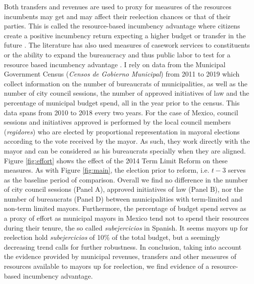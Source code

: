 \documentclass[12pt]{amsart}
\numberwithin{equation}{section}
\theoremstyle{definition}
\theoremstyle{definition}
\theoremstyle{definition}
\begin{document}
Both transfers and revenues are used to proxy for measures of the resources incumbents may get and may affect their reelection chances or that of their parties. This is called the resource-based incumbency advantage where citizens create a positive incumbency return expecting a higher budget or transfer in the future \citep{cox_morgensten_1993}. The literature has also used measures of casework services to constituents or the ability to expand the bureaucracy and thus public labor to test for a resource based incumbency advantage \citep{cox_katz_1996}. I rely on data from the Municipal Government Census (\emph{Censos de Gobierno Municipal}) from 2011 to 2019 which collect information on the number of bureaucrats of municipalities, as well as the number of city council sessions, the number of approved initiatives of law and the percentage of municipal budget spend, all in the year prior to the census. This data spans from 2010 to 2018 every two years. For the case of Mexico, council sessions and initiatives approved is performed by the local council members (\emph{regidores}) who are elected by proportional representation in mayoral elections according to the vote received by the mayor. As such, they work directly with the mayor and can be considered as his bureaucrats specially when they are aligned. Figure \ref{fig:effort} shows the effect of the 2014 Term Limit Reform on these measures. As with Figure \ref{fig:main}, the election prior to reform, i.e. $t-3$ serves as the baseline period of comparison. Overall we find no difference in the number of city council sessions (Panel A), approved initiatives of law (Panel B), nor the number of bureaucrats (Panel D) between municipalities with term-limited and non-term limited mayors. Furthermore, the percentage of budget spend serves as a proxy of effort as municipal mayors in Mexico tend not to spend their resources during their tenure, the so called \emph{subejercicios} in Spanish. It seems mayors up for reelection hold \emph{subejercicios} of 10\% of the total budget, but a seemingly decreasing trend calls for further robustness. In conclusion, taking into account the evidence provided by municipal revenues, transfers and other measures of resources available to mayors up for reelection, we find evidence of a resource-based incumbency advantage.
\end{document}
